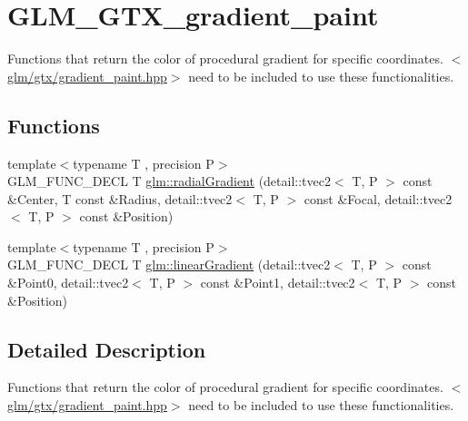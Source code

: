 \hypertarget{group__gtx__gradient__paint}{\section{G\-L\-M\-\_\-\-G\-T\-X\-\_\-gradient\-\_\-paint}
\label{group__gtx__gradient__paint}
}


Functions that return the color of procedural gradient for specific coordinates. $<$\hyperlink{gradient__paint_8hpp}{glm/gtx/gradient\-\_\-paint.\-hpp}$>$ need to be included to use these functionalities.  


\subsection*{Functions}
\begin{DoxyCompactItemize}
\item 
{\footnotesize template$<$typename T , precision P$>$ }\\G\-L\-M\-\_\-\-F\-U\-N\-C\-\_\-\-D\-E\-C\-L T \hyperlink{group__gtx__gradient__paint_ga864c46234e363137b717119231f422f6}{glm\-::radial\-Gradient} (detail\-::tvec2$<$ T, P $>$ const \&Center, T const \&Radius, detail\-::tvec2$<$ T, P $>$ const \&Focal, detail\-::tvec2$<$ T, P $>$ const \&Position)
\item 
{\footnotesize template$<$typename T , precision P$>$ }\\G\-L\-M\-\_\-\-F\-U\-N\-C\-\_\-\-D\-E\-C\-L T \hyperlink{group__gtx__gradient__paint_ga01eb377864e98f86bd44378e1b86eb22}{glm\-::linear\-Gradient} (detail\-::tvec2$<$ T, P $>$ const \&Point0, detail\-::tvec2$<$ T, P $>$ const \&Point1, detail\-::tvec2$<$ T, P $>$ const \&Position)
\end{DoxyCompactItemize}


\subsection{Detailed Description}
Functions that return the color of procedural gradient for specific coordinates. $<$\hyperlink{gradient__paint_8hpp}{glm/gtx/gradient\-\_\-paint.\-hpp}$>$ need to be included to use these functionalities. 

